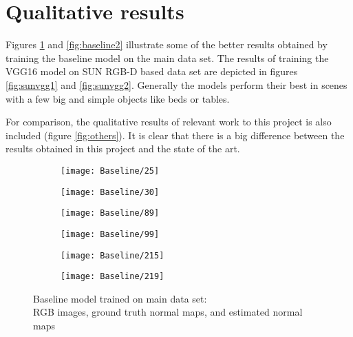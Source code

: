 \section{Qualitative results}

Figures \ref{fig:baseline1} and \ref{fig:baseline2} illustrate some of the better results obtained by training the baseline model on the main data set. The results of training the VGG16 model on SUN RGB-D based data set are depicted in figures \ref{fig:sunvgg1} and \ref{fig:sunvgg2}. Generally the models perform their best in scenes with a few big and simple objects like beds or tables. 

For comparison, the qualitative results of relevant work to this project is also included (figure \ref{fig:others}). It is clear that there is a big difference between the results obtained in this project and the state of the art. 

\pagebreak

\begin{figure}
    \centering
    \begin{subfigure}[b]{0.3\textwidth}
        \texttt{[image: Baseline/25]}
    \end{subfigure}
    \begin{subfigure}[b]{0.3\textwidth}
        \texttt{[image: Baseline/30]}
    \end{subfigure}
    \begin{subfigure}[b]{0.3\textwidth}
        \texttt{[image: Baseline/89]}
    \end{subfigure}
    
    \begin{subfigure}[b]{0.3\textwidth}
        \texttt{[image: Baseline/99]}
    \end{subfigure}
    \begin{subfigure}[b]{0.3\textwidth}
        \texttt{[image: Baseline/215]}
    \end{subfigure}
    \begin{subfigure}[b]{0.3\textwidth}
        \texttt{[image: Baseline/219]}
    \end{subfigure}
    \caption{Baseline model trained on main data set: \\ RGB images, ground truth normal maps, and estimated normal maps}
    \label{fig:baseline1}
\end{figure}

